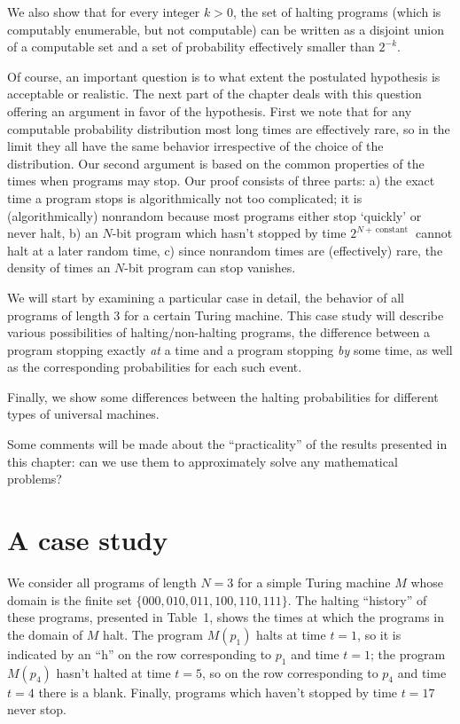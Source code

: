 \documentclass[12pt,twoside,openright]{report}
\begin{document}
We also show that for every integer $k >0$, the set of halting programs (which is computably enumerable, but not computable) can be written as  a disjoint union of a computable set and a set of probability effectively smaller than  $2^{-k}$.

Of course, an important question is to what extent the postulated hypothesis is acceptable or realistic. The next part of the chapter deals with this question offering an argument in favor of the hypothesis.  First we note that for any computable probability distribution most long times are effectively rare, so in the limit they all have the same behavior irrespective of the choice of the distribution. Our second argument is based on the common properties of the times when programs may stop. Our proof consists of three parts: a) the exact time a program stops is algorithmically not too complicated; it is (algorithmically) nonrandom because most  programs either stop `quickly' or never halt, b) an $N$-bit program which hasn't stopped by time $2^{N +\, \mbox{constant }}$ cannot halt at a later random time, c) since nonrandom times are (effectively) rare, the density of times an $N$-bit program can stop vanishes.  


We will start by examining a particular case in detail, the behavior of all programs of length 3 for a certain Turing machine.  This case study will describe various possibilities of halting/non-halting programs, the difference between a program stopping exactly {\em at} a time and a program stopping {\em by} some time, as well as the corresponding probabilities for each such event.


Finally, we show some differences between the halting probabilities for different types of universal machines.

Some comments will be made about the ``practicality'' of the results presented in this chapter: can we use them to approximately solve any mathematical problems?

\section{A case study}

We consider all programs of length $N=3$ for a simple Turing machine $M$  whose domain is the finite set $\{000,010,011,100,110,111\}$. The halting ``history'' of these programs, presented in Table~1, shows the times at which the programs in the domain of $M$ halt. The program $M(p_{1})$ halts at time $t=1$, so it is indicated by an ``h'' on the row corresponding to $p_{1}$ and time $t=1$; the program $M(p_{4})$ hasn't halted at time $t=5$, so on the row corresponding to $p_{4}$ and time $t=4$ there is a blank. Finally, programs which haven't stopped by time $t=17$ never stop.
\end{document}
